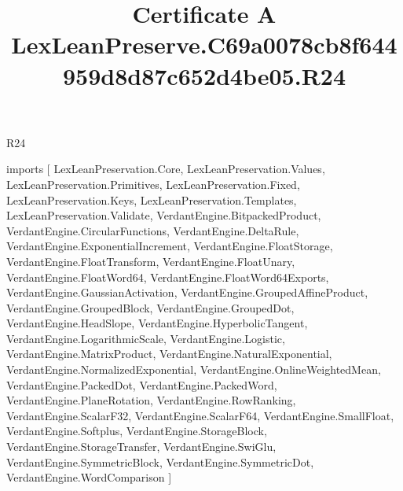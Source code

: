 \begin{lexlean}{R24}
\title{Certificate A LexLeanPreserve.C69a0078cb8f644959d8d87c652d4be05.R24}
\begin{coremodule}
imports [
  LexLeanPreservation.Core,
  LexLeanPreservation.Values,
  LexLeanPreservation.Primitives,
  LexLeanPreservation.Fixed,
  LexLeanPreservation.Keys,
  LexLeanPreservation.Templates,
  LexLeanPreservation.Validate,
  VerdantEngine.BitpackedProduct,
  VerdantEngine.CircularFunctions,
  VerdantEngine.DeltaRule,
  VerdantEngine.ExponentialIncrement,
  VerdantEngine.FloatStorage,
  VerdantEngine.FloatTransform,
  VerdantEngine.FloatUnary,
  VerdantEngine.FloatWord64,
  VerdantEngine.FloatWord64Exports,
  VerdantEngine.GaussianActivation,
  VerdantEngine.GroupedAffineProduct,
  VerdantEngine.GroupedBlock,
  VerdantEngine.GroupedDot,
  VerdantEngine.HeadSlope,
  VerdantEngine.HyperbolicTangent,
  VerdantEngine.LogarithmicScale,
  VerdantEngine.Logistic,
  VerdantEngine.MatrixProduct,
  VerdantEngine.NaturalExponential,
  VerdantEngine.NormalizedExponential,
  VerdantEngine.OnlineWeightedMean,
  VerdantEngine.PackedDot,
  VerdantEngine.PackedWord,
  VerdantEngine.PlaneRotation,
  VerdantEngine.RowRanking,
  VerdantEngine.ScalarF32,
  VerdantEngine.ScalarF64,
  VerdantEngine.SmallFloat,
  VerdantEngine.Softplus,
  VerdantEngine.StorageBlock,
  VerdantEngine.StorageTransfer,
  VerdantEngine.SwiGlu,
  VerdantEngine.SymmetricBlock,
  VerdantEngine.SymmetricDot,
  VerdantEngine.WordComparison
]


\end{coremodule}
\end{lexlean}

